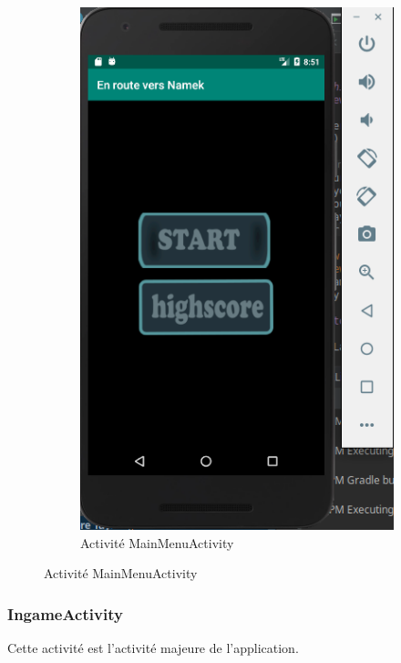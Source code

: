 \documentclass{article}
\begin{document}
\begin{figure}
\centering
 \begin{subfigure}[b]{0.4\textwidth}
  \includegraphics[width=\textwidth]{images/mainMenuView.png}
  \caption{Activité MainMenuActivity}
 \end{subfigure}
\end{figure}

\vspace{1\baselineskip}

\subsubsection{IngameActivity}
Cette activité est l'activité majeure de l'application.
\end{document}
